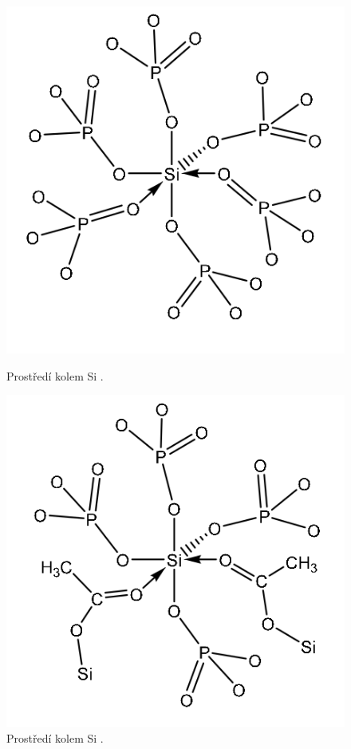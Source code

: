 \documentclass[
  printed, %
  table,   %
  lof,     %
  lot,     %
  oneside,
]{fithesis3}
\begin{document}
\begin{otherlanguage}{czech}
\begin{figure}
\centering
\begin{minipage}{.45\linewidth}
  \includegraphics[width=\linewidth]{si_koordinovane_6_P.png}
  \caption{Prostředí kolem Si \cite{Styskalik2015thesis}.}
  \label{img1}
\end{minipage}
\hspace{.05\linewidth}
\begin{minipage}{.45\linewidth}
  \includegraphics[width=\linewidth]{si_koordinovany_6_C.png}
  \caption{Prostředí kolem Si \cite{Styskalik2015thesis}.}
  \label{img2}
\end{minipage}
\end{figure}


\end{otherlanguage}
\end{document}
